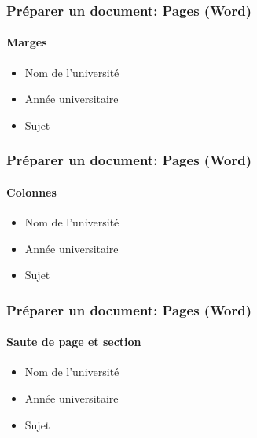 \documentclass[xcolor=table]{beamer}
\begin{document}
\begin{frame}[t]
\frametitle{Préparer un document: Pages (Word)}
\framesubtitle{Marges}

\begin{minipage}{0.38\textwidth}
	\begin{itemize}
		\item Nom de l'université 
		\item Année universitaire
		\item Sujet
	\end{itemize}
\end{minipage}
\begin{minipage}{0.6\textwidth}
\end{minipage}

\end{frame}

\begin{frame}[t]
\frametitle{Préparer un document: Pages (Word)}
\framesubtitle{Colonnes}

\begin{minipage}{0.38\textwidth}
	\begin{itemize}
		\item Nom de l'université 
		\item Année universitaire
		\item Sujet
	\end{itemize}
\end{minipage}
\begin{minipage}{0.6\textwidth}
\end{minipage}

\end{frame}

\begin{frame}[t]
\frametitle{Préparer un document: Pages (Word)}
\framesubtitle{Saute de page et section}

\begin{minipage}{0.38\textwidth}
	\begin{itemize}
		\item Nom de l'université 
		\item Année universitaire
		\item Sujet
	\end{itemize}
\end{minipage}
\begin{minipage}{0.6\textwidth}
\end{minipage}

\end{frame}
\end{document}
